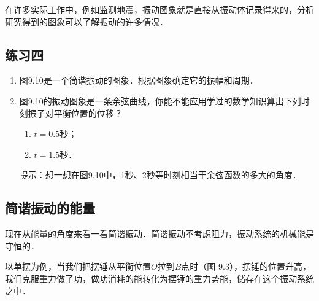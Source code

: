 在许多实际工作中，例如监测地震，振动图象就是直接从振动体记录得来的，分析研究得到的图象可以了解振动的许多情况．
\subsection*{练习四}
\begin{enumerate}
    \item 图9.10是一个简谐振动的图象．根据图象确定它的振幅和周期．
          \begin{figure}[H]
              \centering
              \caption{}
          \end{figure}
    \item 图9.10的振动图象是一条余弦曲线，你能不能应用学过的数学知识算出下列时刻振子对平衡位置的位移？
          \begin{enumerate}
              \item $t=0.5$秒；
              \item $t=1.5$秒．
          \end{enumerate}

          提示：想一想在图9.10中，1秒、2秒等时刻相当于余弦函数的多大的角度．

\end{enumerate}

\subsection{简谐振动的能量}

现在从能量的角度来看一看简谐振动．简谐振动不考虑阻力，振动系统的机械能是守恒的．

以单摆为例，当我们把摆锤从平衡位置$O$拉到$B$点时（图
9.3），摆锤的位置升高，我们克服重力做了功，做功消耗的能转化为摆锤的重力势能，储存在这个振动系统之中．

